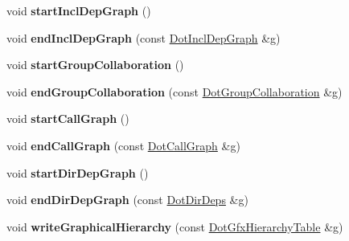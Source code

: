 \begin{DoxyCompactItemize}
\item 
\mbox{\label{class_docbook_generator_a74046c1b25bac8820975d6500b1b3622}} 
void {\bfseries start\+Incl\+Dep\+Graph} ()
\item 
\mbox{\label{class_docbook_generator_ab1cad59b50b6778f2d6499f1c518ad21}} 
void {\bfseries end\+Incl\+Dep\+Graph} (const \mbox{\hyperlink{class_dot_incl_dep_graph}{Dot\+Incl\+Dep\+Graph}} \&g)
\item 
\mbox{\label{class_docbook_generator_a1b52aa2748010155131f9ba8f9b05b73}} 
void {\bfseries start\+Group\+Collaboration} ()
\item 
\mbox{\label{class_docbook_generator_ad7b7bf463930d908ca9e5fc543e163f7}} 
void {\bfseries end\+Group\+Collaboration} (const \mbox{\hyperlink{class_dot_group_collaboration}{Dot\+Group\+Collaboration}} \&g)
\item 
\mbox{\label{class_docbook_generator_abebde9b381282a54746cf0143d8af512}} 
void {\bfseries start\+Call\+Graph} ()
\item 
\mbox{\label{class_docbook_generator_af6b1f23041f8f546c16d6d93e66caff7}} 
void {\bfseries end\+Call\+Graph} (const \mbox{\hyperlink{class_dot_call_graph}{Dot\+Call\+Graph}} \&g)
\item 
\mbox{\label{class_docbook_generator_a3adadd7bdea505c48ec29a245757acd4}} 
void {\bfseries start\+Dir\+Dep\+Graph} ()
\item 
\mbox{\label{class_docbook_generator_a63de1253b88fa892fa7e78d8031f33b0}} 
void {\bfseries end\+Dir\+Dep\+Graph} (const \mbox{\hyperlink{class_dot_dir_deps}{Dot\+Dir\+Deps}} \&g)
\item 
\mbox{\label{class_docbook_generator_a4766607d251b86862bee99f7f5c5e185}} 
void {\bfseries write\+Graphical\+Hierarchy} (const \mbox{\hyperlink{class_dot_gfx_hierarchy_table}{Dot\+Gfx\+Hierarchy\+Table}} \&g)
\item 
\mbox{\label{class_docbook_generator_ad601ba595537a9842927b8d876208450}} 

\end{DoxyCompactItemize}
